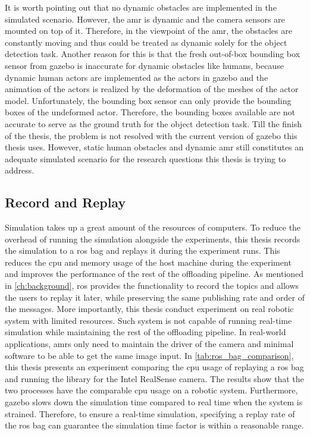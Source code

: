It is worth pointing out that no dynamic obstacles are implemented in the simulated scenario. However, the \gls{amr} is dynamic and the camera sensors are mounted on top of it. Therefore, in the viewpoint of the \gls{amr}, the obstacles are constantly moving and thus could be treated as dynamic solely for the object detection task. Another reason for this is that the fresh out-of-box bounding box sensor from \gls{gazebo} is inaccurate for dynamic obstacles like humans, because dynamic human actors are implemented as the actors in \gls{gazebo} and the animation of the actors is realized by the deformation of the meshes of the actor model. Unfortunately, the bounding box sensor can only provide the bounding boxes of the undeformed actor. Therefore, the bounding boxes available are not accurate to serve as the ground truth for the object detection task. Till the finish of the thesis, the problem is not resolved with the current version of \gls{gazebo} this thesis uses. However, static human obstacles and dynamic \gls{amr} still constitutes an adequate simulated scenario for the research questions this thesis is trying to address. 

\subsection{Record and Replay}

Simulation takes up a great amount of the resources of computers. To reduce the overhead of running the simulation alongside the experiments, this thesis records the simulation to a \gls{ros} bag and replays it during the experiment runs. This reduces the \gls{cpu} and memory usage of the host machine during the experiment and improves the performance of the rest of the offloading pipeline. As mentioned in \cref{ch:background}, \gls{ros} provides the functionality to record the topics and allows the users to replay it later, while preserving the same publishing rate and order of the messages. More importantly, this thesis conduct experiment on real robotic system with limited resources. Such system is not capable of running real-time simulation while maintaining the rest of the offloading pipeline. In real-world applications, \glspl{amr} only need to maintain the driver of the camera and minimal software to be able to get the same image input. In \cref{tab:ros_bag_comparison}, this thesis presents an experiment comparing the \gls{cpu} usage of replaying a \gls{ros} bag and running the library for the Intel RealSense camera. The results show that the two processes have the comparable \gls{cpu} usage on a robotic system. Furthermore, \gls{gazebo} slows down the simulation time compared to real time when the system is strained. Therefore, to ensure a real-time simulation, specifying a replay rate of the \gls{ros} bag can guarantee the simulation time factor is within a reasonable range. 


